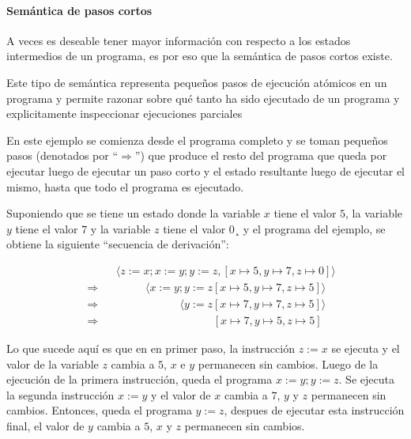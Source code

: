 \paragraph{Semántica de pasos cortos}

A veces es deseable tener mayor información con respecto a los estados intermedios de un programa, es por eso que la semántica de pasos cortos existe.

Este tipo de semántica representa pequeños pasos de ejecución atómicos en un programa y permite razonar sobre qué tanto ha sido ejecutado de un programa y explicitamente inspeccionar ejecuciones parciales~\cite{nipkow}

En este ejemplo se comienza desde el programa completo y se toman pequeños pasos (denotados por ``$\Rightarrow$'') que produce el resto del programa que queda por ejecutar luego de ejecutar un paso corto y el estado resultante luego de ejecutar el mismo, hasta que todo el programa es ejecutado.

Suponiendo que se tiene un estado donde la variable $x$ tiene el valor $5$, la variable $y$ tiene el valor $7$ y la variable $z$ tiene el valor $0$¸ y el programa del ejemplo, se obtiene la siguiente ``secuencia de derivación'':

\begin{equation*}
\begin{split}
& \phantom{\Rightarrow} \phantom{=} \langle z:=x; x:=y; y:=z, [x\mapsto5, y\mapsto7, z\mapsto0]\rangle\\
& \Rightarrow \phantom{=} \phantom{z:=x} \langle x:=y; y:=z [x\mapsto5, y\mapsto7, z\mapsto5]\rangle\\
& \Rightarrow \phantom{=} \phantom{z:=x; x:=y} \langle y:=z [x\mapsto7, y\mapsto7, z\mapsto5]\rangle\\
& \Rightarrow \phantom{=} \phantom{z:=x; x:=y; y:=z} [x\mapsto7, y\mapsto5, z\mapsto5]
\end{split}
\end{equation*}

Lo que sucede aquí es que en en primer paso, la instrucción $z:=x$ se ejecuta y el valor de la variable $z$ cambia a $5$, $x$ e $y$ permanecen sin cambios.
Luego de la ejecución de la primera instrucción, queda el programa $x:=y; y:=z$.
Se ejecuta la segunda instrucción $x:=y$ y el valor de $x$ cambia a $7$, $y$ y $z$ permanecen sin cambios.
Entonces, queda el programa $y:=z$, despues de ejecutar esta instrucción final, el valor de $y$ cambia a $5$, $x$ y $z$ permanecen sin cambios.

